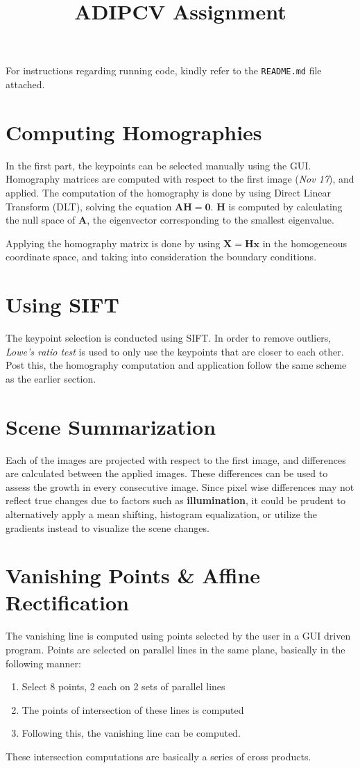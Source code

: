 \documentclass[]{article}
\title{ADIPCV Assignment}
\author{}
\begin{document}
\maketitle

For instructions regarding running code, kindly refer to the \texttt{README.md} file attached.

\section{Computing Homographies}
In the first part, the keypoints can be selected
manually using the GUI. Homography matrices are computed
with respect to the first image (\textit{Nov 17}), and
applied. The computation of the homography is done by
using Direct Linear Transform (DLT), solving the equation
$\mathbf{A}\mathbf{H} = \mathbf{0}$. $\mathbf{H}$ is computed
by calculating the null space of $\mathbf{A}$, the
eigenvector corresponding to the smallest eigenvalue.

Applying the homography matrix is done by using $\mathbf{X} = \mathbf{H} \mathbf{x}$ in the homogeneous coordinate space,
and taking into consideration the boundary conditions.

\section{Using SIFT}
The keypoint selection is conducted using SIFT. In order to
remove outliers, \textit{Lowe's ratio test} is used to only use the keypoints that are closer to each other. Post this,
the homography computation and application follow the same scheme as the earlier section.

\section{Scene Summarization}
Each of the images are projected with respect to the first image,
and differences are calculated between the applied images. These
differences can be used to assess the growth in every consecutive image.
Since pixel wise differences may not reflect true changes due to factors such as \textbf{illumination}, it could be prudent 
to alternatively apply a mean shifting, histogram equalization, or utilize the gradients instead to visualize the scene changes.

\section{Vanishing Points \& Affine Rectification}
The vanishing line is computed using points selected by the user
in a GUI driven program. Points are selected on parallel lines in the same plane, basically in the following manner:
\begin{enumerate}
  \item Select 8 points, 2 each on 2 sets of parallel lines
  \item The points of intersection of these lines is computed 
  \item Following this, the vanishing line can be computed.
\end{enumerate}
These intersection computations are basically a series of cross
products. 
\end{document}
